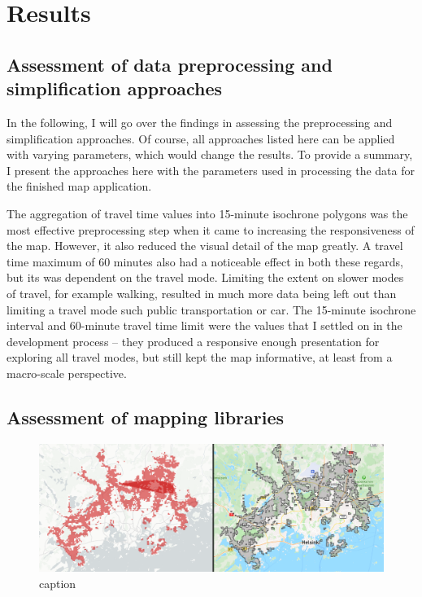 \section{Results}

\subsection{Assessment of data preprocessing and simplification approaches}


In the following, I will go over the findings in assessing the preprocessing and simplification approaches.
Of course, all approaches listed here can be applied with varying parameters,
which would change the results.
To provide a summary,
I present the approaches here with the parameters used in processing the data for the finished map application.

The aggregation of travel time values into 15-minute isochrone polygons was the most 
effective preprocessing step when it came to increasing the responsiveness of the map.
However, it also reduced the visual detail of the map greatly.
A travel time maximum of 60 minutes also had a noticeable effect in both these regards,
but its was dependent on the travel mode.
Limiting the extent on slower modes of travel, for example walking,
resulted in much more data being left out than limiting a travel mode such public transportation or car.
The 15-minute isochrone interval and 60-minute travel time limit
were the values that I settled on in the development process --
they produced a responsive enough presentation for exploring all travel modes,
but still kept the map informative, at least from a macro-scale perspective.







\subsection{Assessment of mapping libraries}



\begin{figure}[H]
	\centering
	\includegraphics[width=\textwidth]{visual/figures/screenshots/bug.png}
	\caption{caption \parencite{deckbug}}
	\label{fig:bug}
\end{figure}

